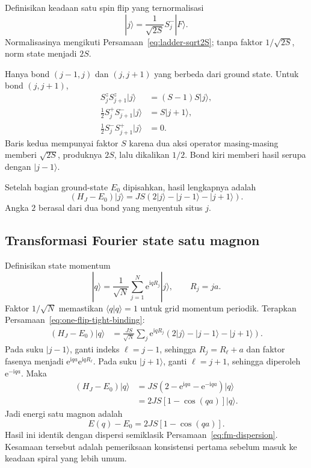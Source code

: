 \documentclass[11pt,a4paper]{article}
\newcommand{\ii}{\mathrm{i}}
\newcommand{\ee}{\mathrm{e}}
\begin{document}
Definisikan keadaan satu spin flip yang ternormalisasi
\begin{equation}
|j\rangle=\frac{1}{\sqrt{2S}}S_j^-|F\rangle.
\label{eq:one-flip-state}
\end{equation}
Normalisasinya mengikuti Persamaan~\eqref{eq:ladder-sqrt2S}; tanpa faktor $1/\sqrt{2S}$, norm state menjadi $2S$.

Hanya bond $(j-1,j)$ dan $(j,j+1)$ yang berbeda dari ground state. Untuk bond $(j,j+1)$,
\begin{align}
S_j^zS_{j+1}^z|j\rangle&=(S-1)S|j\rangle,\\
\frac12S_j^+S_{j+1}^-|j\rangle&=S|j+1\rangle,\\
\frac12S_j^-S_{j+1}^+|j\rangle&=0.
\end{align}
Baris kedua mempunyai faktor $S$ karena dua aksi operator masing-masing memberi $\sqrt{2S}$, produknya $2S$, lalu dikalikan $1/2$. Bond kiri memberi hasil serupa dengan $|j-1\rangle$.

Setelah bagian ground-state $E_0$ dipisahkan, hasil lengkapnya adalah
\begin{equation}
(H_J-E_0)|j\rangle
=JS\left(2|j\rangle-|j-1\rangle-|j+1\rangle\right).
\label{eq:one-flip-tight-binding}
\end{equation}
Angka $2$ berasal dari dua bond yang menyentuh situs $j$.

\subsection{Transformasi Fourier state satu magnon}

Definisikan state momentum
\begin{equation}
|q\rangle=\frac1{\sqrt N}\sum_{j=1}^{N}\ee^{\ii qR_j}|j\rangle,
\qquad R_j=ja.
\end{equation}
Faktor $1/\sqrt N$ memastikan $\langle q|q\rangle=1$ untuk grid momentum periodik. Terapkan Persamaan~\eqref{eq:one-flip-tight-binding}:
\begin{align}
(H_J-E_0)|q\rangle
&=\frac{JS}{\sqrt N}\sum_j\ee^{\ii qR_j}
\left(2|j\rangle-|j-1\rangle-|j+1\rangle\right).
\end{align}
Pada suku $|j-1\rangle$, ganti indeks $\ell=j-1$, sehingga $R_j=R_\ell+a$ dan faktor fasenya menjadi $\ee^{\ii qa}\ee^{\ii qR_\ell}$. Pada suku $|j+1\rangle$, ganti $\ell=j+1$, sehingga diperoleh $\ee^{-\ii qa}$. Maka
\begin{align}
(H_J-E_0)|q\rangle
&=JS\left(2-\ee^{\ii qa}-\ee^{-\ii qa}\right)|q\rangle\\
&=2JS[1-\cos(qa)]|q\rangle.
\end{align}
Jadi energi satu magnon adalah
\begin{equation}
\boxed{E(q)-E_0=2JS[1-\cos(qa)].}
\end{equation}
Hasil ini identik dengan dispersi semiklasik Persamaan~\eqref{eq:fm-dispersion}. Kesamaan tersebut adalah pemeriksaan konsistensi pertama sebelum masuk ke keadaan spiral yang lebih umum.
\end{document}
